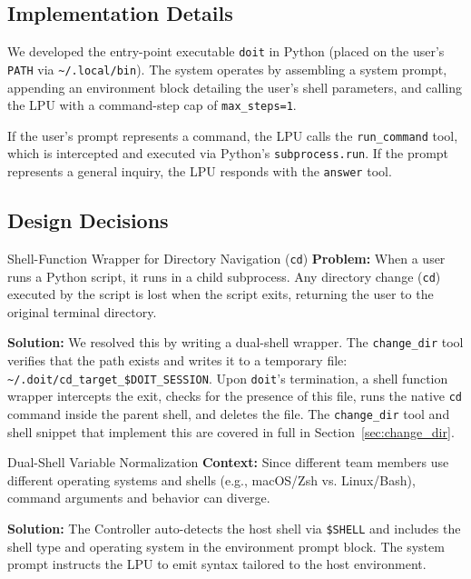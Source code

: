 \documentclass[11pt,a4paper]{article}
\begin{document}
\subsection{Implementation Details}
We developed the entry-point executable \texttt{doit} in Python (placed on the user's \texttt{PATH} via \texttt{\textasciitilde/.local/bin}). The system operates by assembling a system prompt, appending an environment block detailing the user's shell parameters, and calling the LPU with a command-step cap of \texttt{max\_steps=1}. 

If the user's prompt represents a command, the LPU calls the \texttt{run\_command} tool, which is intercepted and executed via Python's \texttt{subprocess.run}. If the prompt represents a general inquiry, the LPU responds with the \texttt{answer} tool.

\subsection{Design Decisions}

\begin{decisionbox}{Shell-Function Wrapper for Directory Navigation (\texttt{cd})}
    \textbf{Problem:} When a user runs a Python script, it runs in a child subprocess. Any directory change (\texttt{cd}) executed by the script is lost when the script exits, returning the user to the original terminal directory.
    
    \textbf{Solution:} We resolved this by writing a dual-shell wrapper. The \texttt{change\_dir} tool verifies that the path exists and writes it to a temporary file: \texttt{\textasciitilde/.doit/cd\_target\_\$DOIT\_SESSION}. Upon \texttt{doit}'s termination, a shell function wrapper intercepts the exit, checks for the presence of this file, runs the native \texttt{cd} command inside the parent shell, and deletes the file. The \texttt{change\_dir} tool and shell snippet that implement this are covered in full in Section~\ref{sec:change_dir}.
    \end{decisionbox}

\begin{decisionbox}{Dual-Shell Variable Normalization}
    \textbf{Context:} Since different team members use different operating systems and shells (e.g., macOS/Zsh vs. Linux/Bash), command arguments and behavior can diverge.
    
    \textbf{Solution:} The Controller auto-detects the host shell via \texttt{\$SHELL} and includes the shell type and operating system in the environment prompt block. The system prompt instructs the LPU to emit syntax tailored to the host environment.
\end{decisionbox}
\end{document}
